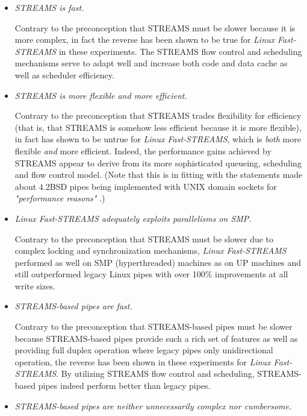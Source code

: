 \documentclass[letterpaper,final,notitlepage,twocolumn,10pt,twoside]{article}
\begin{document}
\begin{itemize}

\item \textit{STREAMS is fast.}

Contrary to the preconception that STREAMS must be slower because it is more
complex, in fact the reverse has been shown to be true for \textsl{Linux
Fast-STREAMS} in these experiments.  The STREAMS flow control and scheduling
mechanisms serve to adapt well and increase both code and data cache as well
as scheduler efficiency.

\item \textit{STREAMS is more flexible {\em and} more efficient.}

Contrary to the preconception that STREAMS trades flexibility for efficiency
(that is, that STREAMS is somehow less efficient because it is more flexible),
in fact has shown to be untrue for \textsl{Linux Fast-STREAMS}, which is {\em
both} more flexible {\em and} more efficient.  Indeed, the performance gains
achieved by STREAMS appear to derive from its more sophisticated queueing,
scheduling and flow control model. (Note that this is in fitting with the
statements made about 4.2BSD pipes being implemented with UNIX domain sockets
for \textit{"performance reasons"} \cite[]{bsd}.)

\item \textit{Linux Fast-STREAMS adequately exploits parallelisms on SMP.}

Contrary to the preconception that STREAMS must be slower due to complex
locking and synchronization mechanisms, \textsl{Linux Fast-STREAMS} performed
as well on SMP (hyperthreaded) machines as on UP machines and still
outperformed legacy Linux pipes with over 100\% improvements at all write
sizes.

\item \textit{STREAMS-based pipes are fast.}

Contrary to the preconception that STREAMS-based pipes must be slower because
STREAMS-based pipes provide such a rich set of features as well as providing
full duplex operation where legacy pipes only unidirectional operation, the
reverse has been shown in these experiments for \textsl{Linux Fast-STREAMS}.
By utilizing STREAMS flow control and scheduling, STREAMS-based pipes indeed
perform better than legacy pipes.

\item \textit{STREAMS-based pipes are neither unnecessarily complex nor cumbersome.}


\end{itemize}
\end{document}
